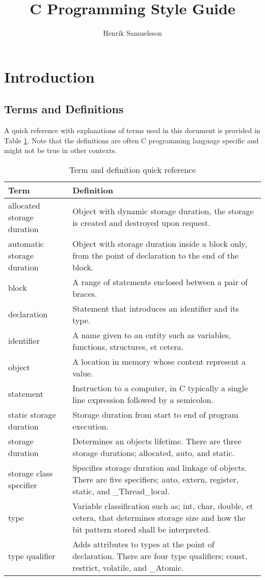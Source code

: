 \documentclass{report}
\title{C Programming Style Guide}
\author{Henrik Samuelsson}
\begin{document}
\maketitle

\tableofcontents
\newpage

\section{Introduction}

\subsection{Terms and Definitions}

A quick reference with explanations of terms used in this document is provided in Table \ref{tab:terms-and-defs}. Note that the definitions are often C programming language specific and might not be true in other contexts.

\begin{table}[h]
\begin{tabularx}{\textwidth}{lX}
\toprule
Term & Definition \\
\midrule
allocated storage duration & Object with dynamic storage duration, the storage is created and destroyed upon request. \\
automatic	storage duration &	Object with storage duration inside a block only, from the point of declaration to the end of the block. \\
block & A range of statements enclosed between a pair of braces. \\
declaration & Statement that introduces an identifier and its type. \\
identifier & A name given to an entity such as variables, functions, structures, et cetera. \\
object & A location in memory whose content represent a value. \\
statement & Instruction to a computer, in C typically a single line expression followed by a semicolon. \\
static storage duration & Storage duration from start to end of program execution. \\
storage duration & Determines an objects lifetime. There are three storage durations; allocated, auto, and static. \\
storage class specifier & Specifies storage duration and linkage of objects. There are five specifiers; auto, extern, register, static, and \_Thread\_local. \\
type & Variable classification such as; int, char, double, et cetera, that determines storage size and how the bit pattern stored shall be interpreted.\\
type qualifier & Adds attributes to types at the point of declaration. There are four type qualifiers; const, restrict, volatile, and \_Atomic. \\
\bottomrule
\end{tabularx}
\caption{Term and definition quick reference}
\label{tab:terms-and-defs}
\end{table}
\end{document}
